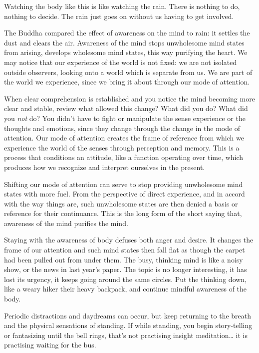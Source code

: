 Watching the body like this is like watching the rain. There is nothing
to do, nothing to decide. The rain just goes on without us having to get
involved.


The Buddha compared the effect of awareness on the mind to rain: it
settles the dust and clears the air. Awareness of the mind stops
unwholesome mind states from arising, develops wholesome mind states,
this way purifying the heart. We may notice that our experience of the
world is not fixed: we are not isolated outside observers, looking onto
a world which is separate from us. We are part of the world we
experience, since we bring it about through our mode of attention.

When clear comprehension is established and you notice the mind becoming
more clear and stable, review what allowed this change? What did you do?
What did you \emph{not} do? You didn't have to fight or manipulate the
sense experience or the thoughts and emotions, since they change through
the change in the mode of attention. Our mode of attention creates the
frame of reference from which we experience the world of the senses
through perception and memory. This is a process that conditions an
attitude, like a function operating over time, which produces how we
recognize and interpret ourselves in the present.

Shifting our mode of attention can serve to stop providing unwholesome
mind states with more fuel. From the perspective of direct experience,
and in accord with the way things are, such unwholesome states are then
denied a basis or reference for their continuance. This is the long form
of the short saying that, awareness of the mind purifies the mind.

Staying with the awareness of body defuses both anger and desire. It
changes the frame of our attention and such mind states then fall flat
as though the carpet had been pulled out from under them. The busy,
thinking mind is like a noisy show, or the news in last year's paper.
The topic is no longer interesting, it has lost its urgency, it keeps
going around the same circles. Put the thinking down, like a weary hiker
their heavy backpack, and continue mindful awareness of the body.

Periodic distractions and daydreams can occur, but keep returning to the
breath and the physical sensations of standing. If while standing, you
begin story-telling or fantasizing until the bell rings, that's not
practising insight meditation\ldots{} it is practising waiting for the
bus.

